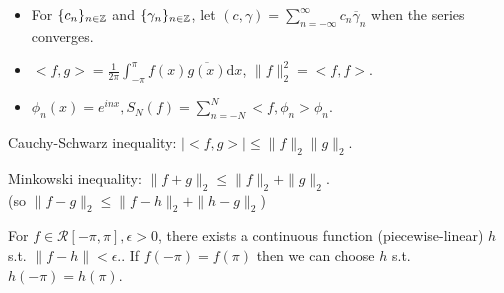 \begin{notation}
	\begin{itemize}
		\item For $\{c_{n}\}_{n \in \mathbb{Z}}$ and $\{\gamma_n\}_{n \in \mathbb{Z}}$, let $(c,\gamma) = \sum_{n=-\infty}^{\infty}{c_n \overline{\gamma}_n}$ when the series converges.
		\item $<f,g> = \frac{1}{2\pi} \int_{-\pi}^{\pi}{f(x) \overline{g(x)}\mathrm{d}x}$, $\|f\|_2^{2}= < f, f >$.
		\item $\phi_n(x)=e^{inx}, S_N(f)= \sum_{n=-N}^{N}{ <f,\phi_n> \phi_n}$.
	\end{itemize}
\end{notation}


\begin{problem}[6.10]
\label{prob:6.10}
Cauchy-Schwarz inequality: $\left|<f,g>\right|\le \|f\|_2 \|g\|_2$.
\end{problem}

\begin{problem}[6.11]
\label{prob:6.11}
Minkowski inequality: $\|f+g\|_2\le \|f\|_2+\|g\|_2$.\\
(so $\|f-g\|_2\le \|f-h\|_2 + \|h-g\|_2$)
\end{problem}

\begin{problem}[6.12]
\label{prob:6.12}
For $f \in \mathscr{R}[-\pi,\pi], \epsilon>0$, there exists a continuous function (piecewise-linear) $h$ s.t. $\|f-h\|<\epsilon$..
If $f(-\pi)=f(\pi)$ then we can choose $h$ s.t. $h(-\pi)=h(\pi)$.
\end{problem}

